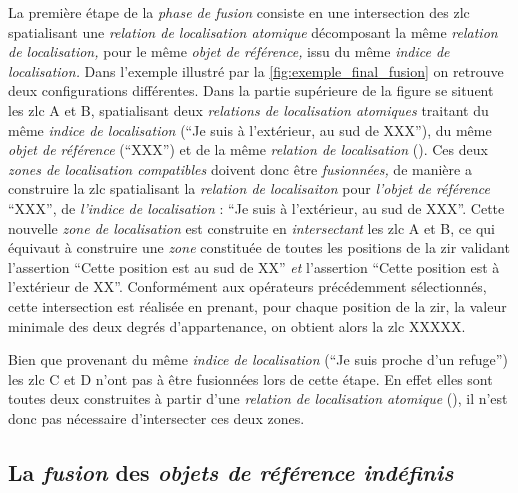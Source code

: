 La première étape de la \emph{phase de fusion} consiste en une
intersection des \ac{zlc} spatialisant une \emph{relation de
  localisation atomique} décomposant la même \emph{relation de
  localisation,} pour le même \emph{objet de référence,} issu du même
\emph{indice de localisation.} Dans l'exemple illustré par la
\autoref{fig:exemple_final_fusion} on retrouve deux configurations
différentes. Dans la partie supérieure de la figure se situent les
\ac{zlc} \textcolor{RdBu-9-1}{\textsf{A}} et
\textcolor{RdBu-9-3}{\textsf{B}}, spatialisant deux \emph{relations de
  localisation atomiques} traitant du même \emph{indice de
  localisation} (\enquote{Je suis à l'extérieur, au sud de XXX}), du
même \emph{objet de référence} (\enquote{XXX}) et de la même
\emph{relation de localisation}
(). Ces deux \emph{zones de
  localisation compatibles} doivent donc être \emph{fusionnées,} de
manière a construire la \ac{zlc} spatialisant la \emph{relation de
  localisaiton}  pour
\emph{l'objet de référence} \enquote{XXX}, de \emph{l'indice de
  localisation} : \enquote{Je suis à l'extérieur, au sud de
  XXX}. Cette nouvelle \emph{zone de localisation} est construite en
\emph{intersectant} les \ac{zlc} \textcolor{RdBu-9-1}{\textsf{A}} et
\textcolor{RdBu-9-3}{\textsf{B}}, ce qui équivaut à construire une
\emph{zone} constituée de toutes les positions de la \ac{zir} validant
l'assertion \enquote{Cette position est au sud de XX} \emph{et}
l'assertion \enquote{Cette position est à l'extérieur de
  XX}. Conformément aux opérateurs précédemment sélectionnés, cette
intersection est réalisée en prenant, pour chaque position de la
\ac{zir}, la valeur minimale des deux degrés d'appartenance, on
obtient alors la \ac{zlc} XXXXX.

Bien que provenant du même \emph{indice de localisation} (\enquote{Je
  suis proche d'un refuge}) les \ac{zlc}
\textcolor{RdBu-9-7}{\textsf{C}} et \textcolor{RdBu-9-9}{\textsf{D}}
n'ont pas à être fusionnées lors de cette étape. En effet elles sont
toutes deux construites à partir d'une \emph{relation de localisation
  atomique} (), il n'est donc pas nécessaire
d'intersecter ces deux zones.

\subsection{La \emph{fusion} des \emph{objets de référence indéfinis}}


